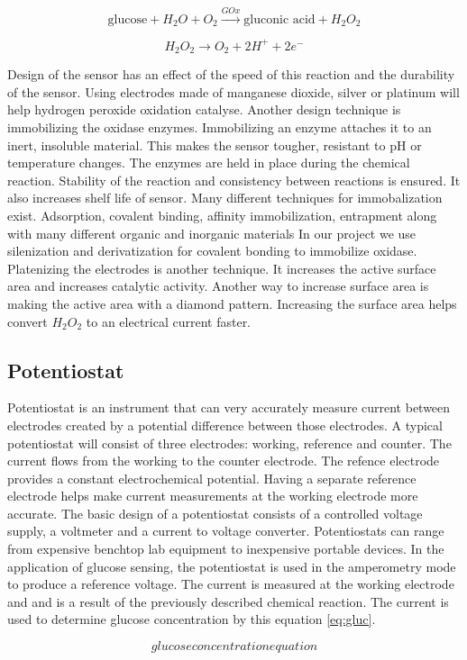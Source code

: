 \begin{equation} \label{eq:glux}
\text{glucose} + H_2O + O_2 \xrightarrow{GOx}  \text{gluconic acid} + H_2O_2
\end{equation}

\begin{equation} \label{eq:perox}
H_2O_2 \rightarrow O_2 + 2H^+ + 2e^-
\end{equation}

Design of the sensor has an effect of the speed of this reaction and the durability of the sensor. Using electrodes made of manganese dioxide, silver or platinum will help hydrogen peroxide oxidation catalyse. \cite{Raba:1995}
Another design technique is immobilizing the oxidase enzymes. Immobilizing an enzyme attaches it to an inert, insoluble material. This makes the sensor tougher, resistant to pH or temperature changes. The enzymes are held in place during the chemical reaction. Stability of the reaction and consistency between reactions is ensured. It also increases shelf life of sensor. Many different techniques for immobalization exist. Adsorption, covalent binding, affinity immobilization, entrapment along with many different organic and inorganic materials \cite{Datta:2013} In our project we use silenization and derivatization for covalent bonding to immobilize oxidase. \cite{Urban:1991} Platenizing the electrodes is another technique. It increases the active surface area and increases catalytic activity. Another way to increase surface area is making the active area with a diamond pattern. Increasing the surface area helps convert $ H_{2}O_{2}$ to an electrical current faster. \cite{Zhang:1996}

\subsection{Potentiostat}
Potentiostat is an instrument that can very accurately measure current between electrodes created by a potential difference between those electrodes. A typical potentiostat will consist of three electrodes: working, reference and counter. The current flows from the working to the counter electrode. The refence electrode provides a constant electrochemical potential. Having a separate reference electrode helps make current measurements at the working electrode more accurate. The basic design of a potentiostat consists of a controlled voltage supply, a voltmeter and a current to voltage converter. \cite{Penn:2010} Potentiostats can range from expensive benchtop lab equipment to inexpensive portable devices. \cite{Row:2011} In the application of glucose sensing, the potentiostat is used in the amperometry mode to produce a reference voltage. The current is measured at the working electrode and and is a result of the previously described chemical reaction. The current is used to determine glucose concentration by this equation \ref{eq:gluc}.

\begin{equation} \label{eq:gluc}
glucose concentration equation
\end{equation}
